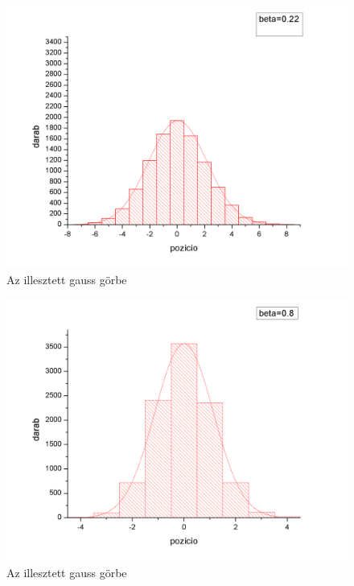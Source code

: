 \documentclass[paper=a4, fontsize=11pt]{article}
\begin{document}
\begin{figure}[H]
\includegraphics[width=\textwidth]{3g.png}
\caption{Az illesztett gauss görbe}
\end{figure}
\begin{figure}[H]
\includegraphics[width=\textwidth]{4g.png}
\caption{Az illesztett gauss görbe}
\end{figure}

 
\end{document}
